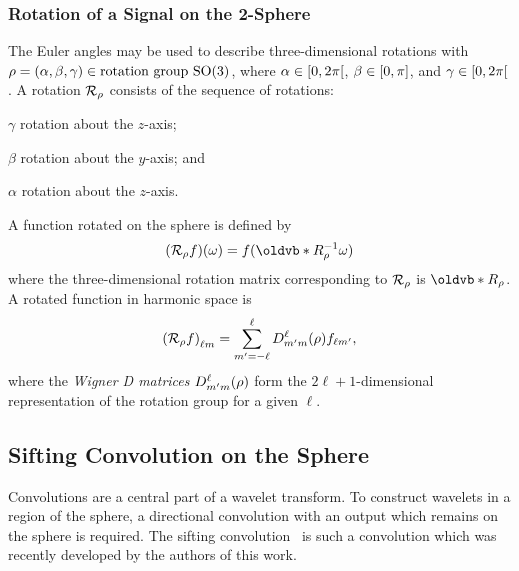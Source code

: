 \subsubsection{Rotation of a Signal on the 2-Sphere}

The Euler angles may be used to describe three-dimensional rotations with \(\rho = (\alpha,\beta,\gamma) \in \text{rotation group } \text{SO(3)}{}\), where \(\alpha \in \interval[open right]{0}{2\pi}\), \(\beta \in \interval{0}{\pi}\), and \(\gamma \in \interval[open right]{0}{2\pi}\).
A rotation \(\mathcal{R}_{\rho}\) consists of the sequence of rotations:
%
\begin{inparaenum}[(i)]
	\item \({\gamma}\) rotation about the \(z\)-axis;
	\item \({\beta}\) rotation about the \(y\)-axis; and
	\item \({\alpha}\) rotation about the \(z\)-axis.
\end{inparaenum}
%
A function rotated on the sphere is defined by
%
\begin{equation}
	\pixel{(\rotation{\rho}f)}
	= f(\vb{R}_{\rho}^{-1} \omega)
\end{equation}
%
where the three-dimensional rotation matrix corresponding to \(\mathcal{R}_{\rho}\) is \(\vb{R}_{\rho}\).
A rotated function in harmonic space is
%
\begin{equation}
	{(\mathcal{R}_{\rho}f)}_{\ell m}
	= \sum\limits_{m'=-\ell}^{\ell} D^{\ell}_{m'm}(\rho) f_{\ell m'},
\end{equation}
%
where the \emph{Wigner D matrices} \(D^{\ell}_{m'm}(\rho)\) form the \(2\ell+1\)-dimensional representation of the rotation group for a given \({\ell}\).

\subsection{Sifting Convolution on the Sphere}\label{sec:chapter3_sifting_convolution_sphere}

Convolutions are a central part of a wavelet transform.
To construct wavelets in a region of the sphere, a directional convolution with an output which remains on the sphere is required.
The sifting convolution~\cite{Roddy2021} is such a convolution which was recently developed by the authors of this work.

